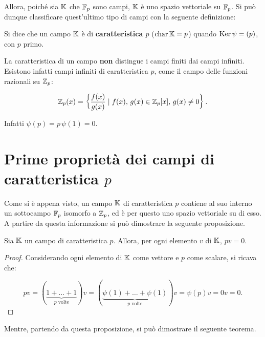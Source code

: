 Allora, poiché sia $\mathbb{K}$ che $\mathbb{F}_p$ sono campi, $\mathbb{K}$ è uno spazio
vettoriale su $\mathbb{F}_p$. Si può dunque classificare quest'ultimo tipo di
campi con la seguente definizione:

\begin{definition}
    Si dice che un campo $\mathbb{K}$ è di \textbf{caratteristica $p$} ($\operatorname{char} \mathbb{K} = p$)
    quando $\operatorname{Ker} \psi = (p)$, con $p$ primo.
\end{definition}

\begin{remark*}
    La caratteristica di un campo \textbf{non} distingue i campi finiti
    dai campi infiniti. Esistono infatti campi infiniti di caratteristica
    $p$, come il campo delle funzioni razionali su $\mathbb{Z}_p$:

    \[ \mathbb Z_p(x) =  \left\{ \frac{f(x)}{g(x)} \mid f(x),\, g(x) \in \mathbb{Z}_p[x],\, g(x) \neq 0 \right\}. \]

    \vskip 0.1in

    Infatti $\psi(p) = p \, \psi(1) = 0$.
\end{remark*}

\section{Prime proprietà dei campi di caratteristica \texorpdfstring{$p$}{p}}

Come si è appena visto, un campo $\mathbb{K}$ di caratteristica $p$ contiene
al suo interno un sottocampo $\mathbb{F}_p$ isomorfo a $\mathbb{Z}_p$, ed è per questo
uno spazio vettoriale su di esso. A partire da questa informazione si
può dimostrare la seguente proposizione.

\begin{proposition}
    \label{prop:campo_char_p_prodotto_per_p}
    Sia $\mathbb{K}$ un campo di caratteristica $p$. Allora, per ogni
    elemento $v$ di $\mathbb{K}$, $pv=0$.
\end{proposition}

\begin{proof}
    Considerando ogni elemento di $\mathbb{K}$ come vettore e $p$ come
    scalare, si ricava che:

    \[ pv=(\underbrace{1+\ldots+1}_{p\text{ volte}})v=
        (\underbrace{\psi(1)+\ldots+\psi(1)}_{p\text{ volte}})v=
        \psi(p)v=0v=0. \]

\end{proof}

Mentre, partendo da questa proposizione, si può dimostrare il
seguente teorema.

